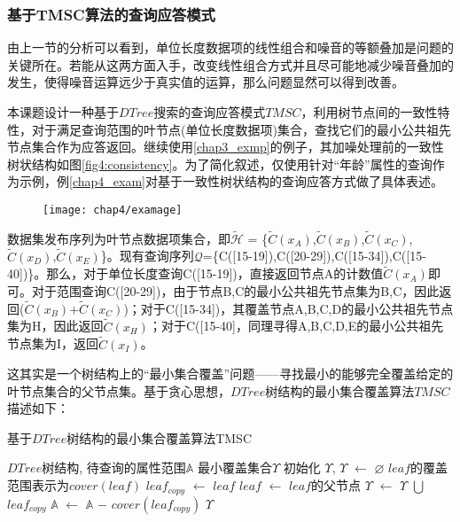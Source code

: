 \subsubsection{基于TMSC算法的查询应答模式}

由上一节的分析可以看到，单位长度数据项的线性组合和噪音的等额叠加是问题的关键所在。若能从这两方面入手，改变线性组合方式并且尽可能地减少噪音叠加的发生，使得噪音运算远少于真实值的运算，那么问题显然可以得到改善。

本课题设计一种基于$DTree$搜索的查询应答模式$TMSC$，利用树节点间的一致性特性，对于满足查询范围的叶节点(单位长度数据项)集合，查找它们的最小公共祖先节点集合作为应答返回。继续使用\ref{chap3_exmp}的例子，其加噪处理前的一致性树状结构如图\ref{fig4:consistency}。为了简化叙述，仅使用针对“年龄”属性的查询作为示例，例\ref{chap4_exam}对基于一致性树状结构的查询应答方式做了具体表述。

\begin{figure}[!htp]
	\centering
	\texttt{[image: chap4/examage]}
\end{figure}

\begin{exmp}
	\label{chap4_exam}
数据集发布序列为叶节点数据项集合，即$\tilde{\mathcal{H}}$ = \{$\tilde{C}(x_{A})$,$\tilde{C}(x_{B})$,$\tilde{C}(x_{C})$,$\tilde{C}(x_{D})$,$\tilde{C}(x_{E})$\}。现有查询序列$\mathcal{Q}$=\{C([15-19]),C([20-29]),C([15-34]),C([15-40])\}。那么，对于单位长度查询C([15-19])，直接返回节点A的计数值$\tilde{C}(x_{A})$即可。对于范围查询C([20-29])，由于节点B,C的最小公共祖先节点集为{B,C}，因此返回($\tilde{C}(x_{B})$+$\tilde{C}(x_{C})$)；对于C([15-34])，其覆盖节点A,B,C,D的最小公共祖先节点集为{H}，因此返回$\tilde{C}(x_{H})$；对于C([15-40]，同理寻得A,B,C,D,E的最小公共祖先节点集为{I}，返回$\tilde{C}(x_{I})$。
\end{exmp}

这其实是一个树结构上的“最小集合覆盖”问题——寻找最小的能够完全覆盖给定的叶节点集合的父节点集。基于贪心思想，$DTree$树结构的最小集合覆盖算法$TMSC$描述如下：

\begin{algorithm}[H]
	\caption{基于$DTree$树结构的最小集合覆盖算法TMSC}\label{euclid}
	\label{msc}
	\begin{algorithmic}[1]
		\REQUIRE $DTree$树结构, 待查询的属性范围$\mathbb{A}$
		\ENSURE 最小覆盖集合$\Upsilon$
		初始化 $\Upsilon$, $\Upsilon$ $\leftarrow$ $\varnothing$
		\STATE $leaf$的覆盖范围表示为$cover(leaf)$
		\STATE $leaf_{copy}$ $\leftarrow$ $leaf$
		\STATE $leaf$ $\leftarrow$ $leaf$的父节点
		\ENDWHILE 
		\STATE $\Upsilon$ $\leftarrow$ $\Upsilon$ $\bigcup$ $leaf_{copy}$
		\STATE $\mathbb{A}$ $\leftarrow$ $\mathbb{A}$ $-$ $cover(leaf_{copy})$
		\RETURN $\Upsilon$
		\ENDIF
		\ENDFOR
	\end{algorithmic}
\end{algorithm}

